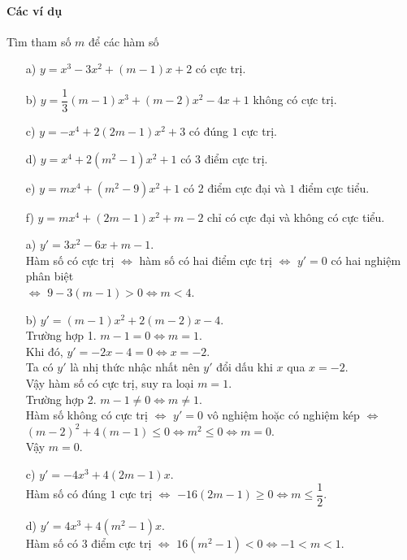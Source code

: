 \paragraph{Các ví dụ}
\begin{vd}%
	Tìm tham số $m$ để các hàm số
\begin{enumerate}
	\item[a)] $y=x^3-3x^2+(m-1)x+2$ có cực trị.
	\item[b)] $y=\dfrac{1}{3}(m-1)x^3+(m-2)x^2-4x+1$ không có cực trị.
	\item[c)] $y=-x^4+2(2m-1)x^2+3$ có đúng $1$ cực trị.
	\item[d)] $y=x^4+2\left(m^2-1\right)x^2+1$ có $3$ điểm cực trị.
	\item[e)] $y=mx^4+\left(m^2-9\right)x^2+1$ có $2$ điểm cực đại và $1$ điểm cực tiểu.
	\item[f)] $y=mx^4+(2m-1)x^2+m-2$ chỉ có cực đại và không có cực tiểu.
\end{enumerate}
\loigiai
{
\begin{enumerate}
	\item[a)] $y'=3x^2-6x+m-1$.\\
Hàm số có cực trị $\Leftrightarrow$ hàm số có hai điểm cực trị $\Leftrightarrow$ $y'=0$ có hai nghiệm phân biệt \\
$\Leftrightarrow$ $9-3(m-1)>0\Leftrightarrow m<4$.
\item[b)] $y'=(m-1)x^2+2(m-2)x-4$.\\
Trường hợp 1. $m-1=0\Leftrightarrow m=1$. \\
Khi đó, $y'=-2x-4=0\Leftrightarrow x=-2$.\\
Ta có $y'$ là nhị thức nhậc nhất nên $y'$ đổi dấu khi $x$ qua $x=-2$.\\
Vậy hàm số có cực trị, suy ra loại $m=1$.\\
Trường hợp 2. $m-1\neq0\Leftrightarrow m\neq1$. \\
Hàm số không có cực trị $\Leftrightarrow$ $y'=0$ vô nghiệm hoặc có nghiệm kép $\Leftrightarrow$ $\left(m-2\right)^2+4(m-1)\leq0\Leftrightarrow m^2\leq0\Leftrightarrow m=0$.\\
Vậy $m=0$.
\item[c)] $y'=-4x^3+4(2m-1)x$. \\
Hàm số có đúng $1$ cực trị $\Leftrightarrow$ $-16(2m-1)\geq0\Leftrightarrow m\leq\dfrac{1}{2}$.
\item[d)] $y'=4x^3+4\left(m^2-1\right)x$. \\
Hàm số có $3$ điểm cực trị $\Leftrightarrow$ $16\left(m^2-1\right)<0\Leftrightarrow -1<m<1$.

\end{enumerate}}
\end{vd}
